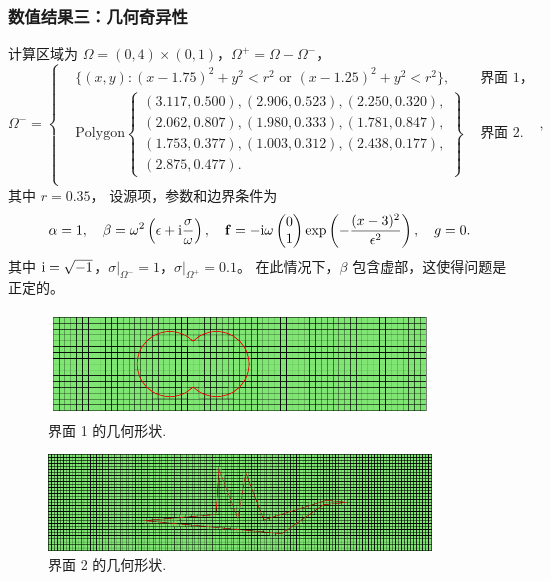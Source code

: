 \documentclass[notheorems,serif]{beamer}
\begin{document}
\begin{frame}
    \frametitle{数值结果三：几何奇异性}
\small
计算区域为 $\Omega=(0, 4)\times(0, 1)$，$\Omega^+ = \Omega - \Omega^-$，
$$
\Omega^- = \left\{
\begin{aligned}
&\{(x, y) : (x-1.75)^2 + y^2 < r^2  \text{ or }
(x-1.25)^2 + y^2 < r^2  \},\quad
& \text{ 界面 1，}\\
&\mathrm{Polygon}
\left\{
\begin{matrix}
 (3.117, 0.500),
 (2.906, 0.523),
 (2.250, 0.320),\\
 (2.062, 0.807),
 (1.980, 0.333),
 (1.781, 0.847),\\
 (1.753, 0.377),
 (1.003, 0.312),
 (2.438, 0.177),\\
 (2.875, 0.477).
\end{matrix}
\right\}
& \text{ 界面 2.}\\
\end{aligned}
\right.,
$$
其中 $r = 0.35$，
设源项，参数和边界条件为
$$
\alpha = 1, \quad \beta = \omega^2 \left( \epsilon + {\rm i} \frac{\sigma}{\omega} \right), \quad {\bf f} = -{\rm i}\omega \begin{pmatrix}
0\\
1
\end{pmatrix} \exp\left(-\frac{(x-3)^2}{\epsilon^2}\right), \quad g = 0.
$$
其中 ${\rm i} = \sqrt{-1}$，$\sigma|_{\Omega^-} = 1$，$\sigma|_{\Omega^+} = 0.1$。
在此情况下，$\beta$ 包含虚部，这使得问题是正定的。
\end{frame}

\begin{frame}
\begin{figure}[h]
\centering
\includegraphics[width=4in]{../figures/maxwell/mesh_double_circle.pdf}
\caption{界面 1 的几何形状.}
\label{fig:interfacedoublecircle}
\end{figure}
\begin{figure}[h]
\centering
\includegraphics[width=4in]{../figures/maxwell/poly_interface.pdf}
\caption{界面 2 的几何形状.}
\label{fig:interfacepoly}
\end{figure}
\end{frame}
\end{document}
